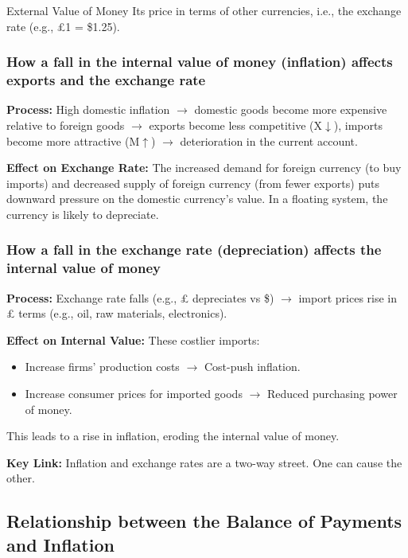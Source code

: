\documentclass[11pt, a4paper, twoside]{book}
\begin{document}
\begin{keyterm}{External Value of Money}
Its price in terms of other currencies, i.e., the exchange rate (e.g., £1 = \$1.25).
\end{keyterm}

\subsubsection{How a fall in the internal value of money (inflation) affects exports and the exchange rate}

\textbf{Process:} High domestic inflation $\rightarrow$ domestic goods become more expensive relative to foreign goods $\rightarrow$ exports become less competitive (X$\downarrow$), imports become more attractive (M$\uparrow$) $\rightarrow$ deterioration in the current account.

\textbf{Effect on Exchange Rate:} The increased demand for foreign currency (to buy imports) and decreased supply of foreign currency (from fewer exports) puts downward pressure on the domestic currency's value. In a floating system, the currency is likely to depreciate.

\subsubsection{How a fall in the exchange rate (depreciation) affects the internal value of money}

\textbf{Process:} Exchange rate falls (e.g., £ depreciates vs \$) $\rightarrow$ import prices rise in £ terms (e.g., oil, raw materials, electronics).

\textbf{Effect on Internal Value:} These costlier imports:
\begin{itemize}
  \item Increase firms' production costs $\rightarrow$ Cost-push inflation.
  \item Increase consumer prices for imported goods $\rightarrow$ Reduced purchasing power of money.
\end{itemize}
This leads to a rise in inflation, eroding the internal value of money.

\begin{coreidea}
\textbf{Key Link:} Inflation and exchange rates are a two-way street. One can cause the other.
\end{coreidea}

\subsection{Relationship between the Balance of Payments and Inflation}
\end{document}
